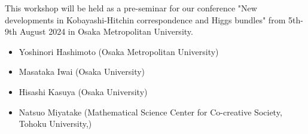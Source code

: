 \documentclass[dvipdfmx,a4paper,12pt]{article}
\theoremstyle{plain} %
\theoremstyle{definition} %
\begin{document}
\begin{comment}

\begin{table}[htb]
\centering
  \begin{tabular}{| c | | c | c | c |}  \hline
  Time  & 3/22(水) & 3/23(木)& 3/23(金)  \\ \hline 
     \begin{tabular}{c} GMT 6:00-7:00 \\ (JST 15:00-16:00)\end{tabular}
&Shin-ichi Matsumura & Jihun Yum&Seungjae Lee \\ \hline
      \begin{tabular}{c}   GMT 7:10-8:10 \\ (JST 16:10-17:10)  \end{tabular}
& Junchao Shentu & Hoseob Seo&\sout{ Juanyong Wang}\\ \hline
 \begin{tabular}{c}   GMT 8:40-9:40\\ (JST 17:40-18:40) \end{tabular}
&  Feng Hao& F\'elix Lequen& Lukas Braun \\ \hline
 \begin{tabular}{c}   GMT 11:30-12:30\\ (JST 20:30-21:30) \end{tabular}
&  Xiaojun Wu &  Olivier Thom &    \\ \hline
  \end{tabular}
\end{table}
\end{comment}

\vskip8mm

This workshop will be held as a pre-seminar for our conference 
"New developments in Kobayashi-Hitchin correspondence and Higgs bundles"
from 5th-9th August 2024 in Osaka Metropolitan University.

\vskip8mm
 \vspace{-11pt}
\begin{itemize}
  \setlength{\parskip}{0cm} 
  \setlength{\itemsep}{0cm}
\item Yoshinori Hashimoto (Osaka Metropolitan University)
\item Masataka Iwai (Osaka University)
\item Hisashi Kasuya (Osaka University)
\item Natsuo Miyatake (Mathematical Science Center for Co-creative Society, Tohoku University,)
  \end{itemize}
\end{document}
